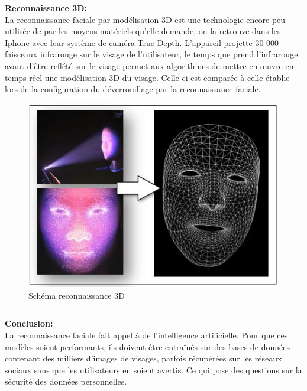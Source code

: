 \documentclass{beamer}
\begin{document}
\begin{columns}
	\begin{column}{.3\textwidth}
	\color{blancCreme}
   {\bf Reconnaissance 3D:}\\
La reconnaissance faciale par modélisation 3D est une technologie encore peu utilisée de par les moyens matériels qu’elle demande, on la retrouve dans les Iphone avec leur système de caméra True Depth. L’appareil projette 30 000 faisceaux infrarouge sur le visage de l’utilisateur, le temps que prend l’infrarouge avant d’être reflété sur le visage permet aux algorithmes de mettre en œuvre en temps réel une modélisation 3D du visage. Celle-ci est comparée à celle établie lors de la configuration du déverrouillage par la reconnaissance faciale.\par
	\begin{figure}
	\color{blancCreme}
		\caption{Schéma reconnaissance 3D}
		\includegraphics[width=15cm]{Reco3D.jpg}
	\end{figure}
	\end{column}
\end{columns}

\begin{columns}[t]
	\begin{column}{.9\textwidth}
	\color{blancCreme}
	{\bf Conclusion:}\\
   	La reconnaissance faciale fait appel à de l’intelligence artificielle. Pour que ces modèles soient performants, ils doivent être entraînés sur des bases de données contenant des milliers d’images de visages, parfois récupérées sur les réseaux sociaux sans que les utilisateurs en soient avertis. Ce qui pose des questions sur la sécurité des données personnelles.\par
   	\hrulefill
	\end{column}	
\end{columns}
\end{document}
